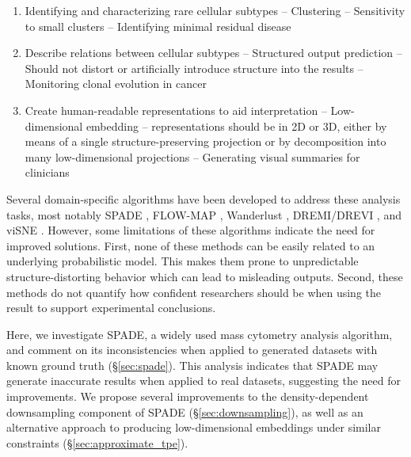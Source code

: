 \documentclass{article}
\begin{document}
\begin{enumerate}
\item Identifying and characterizing rare cellular subtypes -- Clustering --
Sensitivity to small clusters -- Identifying minimal residual disease 

\item Describe relations between cellular subtypes -- Structured output prediction -- Should not distort or artificially introduce structure into the results --  Monitoring clonal evolution in cancer 

\item Create human-readable representations to aid interpretation -- Low-dimensional embedding -- representations should be in 2D or 3D, either by means of a single structure-preserving projection or by decomposition into many low-dimensional projections -- Generating visual summaries for clinicians 
\end{enumerate}

Several domain-specific algorithms have been developed to address these analysis tasks, most notably SPADE \cite{}, FLOW-MAP \cite{}, Wanderlust \cite{}, DREMI/DREVI \cite{}, and viSNE \cite{}.  However, some limitations of these algorithms indicate the need for improved solutions.  First, none of these methods can be easily related to an underlying probabilistic model. This makes them prone to unpredictable structure-distorting behavior which can lead to misleading outputs. Second, these methods do not quantify how confident researchers should be when using the result to support experimental conclusions.

Here, we investigate SPADE, a widely used mass cytometry analysis algorithm,  and comment on its inconsistencies when applied to generated datasets with known ground truth (\S\ref{sec:spade}). This analysis indicates that SPADE may generate inaccurate results when applied to real datasets, suggesting the need for improvements.  We propose several improvements to the density-dependent downsampling component of SPADE  (\S\ref{sec:downsampling}), as well as an alternative approach to producing low-dimensional embeddings under similar constraints (\S\ref{sec:approximate_tpe}).   
\end{document}
